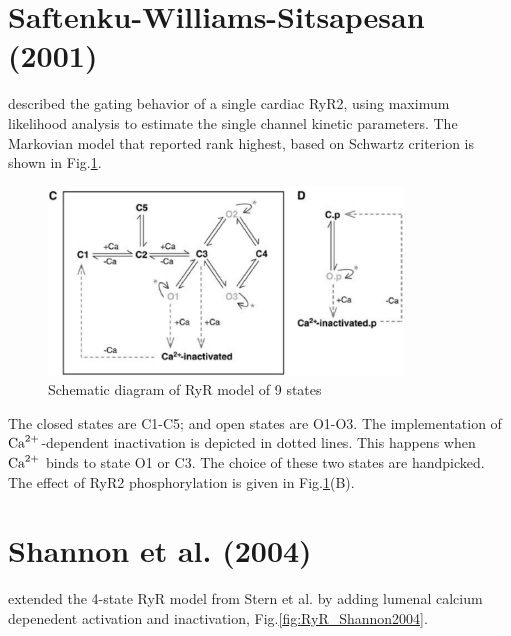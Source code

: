 \section{Saftenku-Williams-Sitsapesan (2001)}
\label{sec:RYR_Saftenku2001}

\citep{saftenku2001} described the gating behavior of a single cardiac RyR2,
using maximum likelihood analysis to estimate the single channel kinetic
parameters. The Markovian model that reported rank highest, based on Schwartz
criterion is shown in Fig.\ref{fig:RYR_Saftenku2001}.



\begin{figure}[hbt]
  \centerline{\includegraphics[height=5cm]{./images/RYR_Saftenku2001.eps}}
\caption{Schematic diagram of RyR model of 9 states}
\label{fig:RYR_Saftenku2001}
\end{figure}


The closed states are C1-C5; and open states are O1-O3. The implementation of
${\text{Ca}^{2+}}$-dependent inactivation is depicted in dotted lines. This happens when
${\text{Ca}^{2+}}$ binds to state O1 or C3. The choice of these two states are handpicked.
The effect of RyR2 phosphorylation is given in
Fig.\ref{fig:RYR_Saftenku2001}(B).

\section{Shannon et al. (2004)	}
\label{sec:RyR_Shannon2004}

\citep{shannon2004} extended the 4-state RyR model from Stern et al.
\citep{stern1999lcm} by adding lumenal calcium depenedent activation and
inactivation, Fig.\ref{fig:RyR_Shannon2004}.


